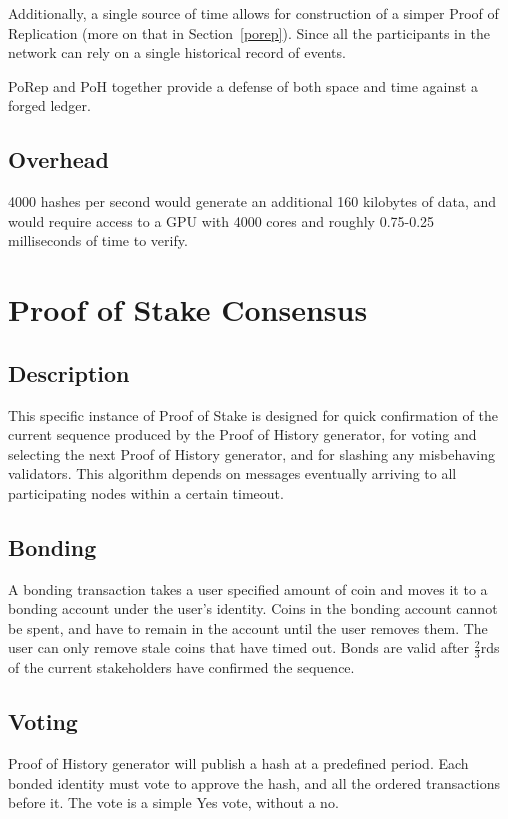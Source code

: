 \documentclass[12pt]{article}
\begin{document}
Additionally, a single source of time allows for construction of a simper Proof of Replication (more on that in Section~\ref{porep}).  Since all the participants in the network can rely on a single historical record of events.

PoRep and PoH together provide a defense of both space and time against a forged ledger.

\subsection{Overhead}
4000 hashes per second would generate an additional 160 kilobytes of data, and would require access to a GPU with 4000 cores and roughly 0.75-0.25 milliseconds of time to verify.

\section{Proof of Stake Consensus}\label{proof_of_stake}
\subsection{Description}
This specific instance of Proof of Stake is designed for quick confirmation of the current sequence produced by the Proof of History generator, for voting and selecting the next Proof of History generator, and for slashing any misbehaving validators.  This algorithm depends on messages eventually arriving to all participating nodes within a certain timeout.
\subsection{Bonding}
A bonding transaction takes a user specified amount of coin and moves it to a bonding account under the user’s identity.  Coins in the bonding account cannot be spent, and have to remain in the account until the user removes them.  The user can only remove stale coins that have timed out. Bonds are valid after \(\frac{2}{3}\)rds of the current stakeholders have confirmed the sequence.

\subsection{Voting}
Proof of History generator will publish a hash at a predefined period.  Each bonded identity must vote to approve the hash, and all the ordered transactions before it.  The vote is a simple Yes vote, without a no.
\end{document}
